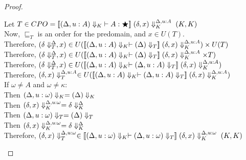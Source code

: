 \begin{proof}
\begin{itemize}
\begin{tabbedproof}
    \ooooo Let $T \in CPO = \interp{\judgeWK[\restrictkind{\Delta, u:A}]{A}{\bigstar}}\;
                               \restricttyenv{\Delta, u:A}{(\delta, x)}\;(K,K)$ \\
    \ooooo Now, $\sqsubseteq_T$ is an order for the predomain, and $x \in U(T)$. \\
    \ooooo Therefore, $(\restrictvals{\Delta}{\delta}, x) \in 
                         U(\interp{\restrictkind{\Delta, u:A} \vdash \restricttype{\Delta}}\;
            \restricttyenv{\Delta, u:A}{(\delta, x)}) \times U(T)$ \\
    \ooooo Therefore, $(\restrictvals{\Delta}{\delta}, x) \in 
                         U(\interp{\restrictkind{\Delta, u:A} \vdash \restricttype{\Delta}}\;
            \restricttyenv{\Delta, u:A}{(\delta, x)} \times T)$ \\
    \ooooo Therefore, $(\restrictvals{\Delta}{\delta}, x) \in 
                         U(\interp{\restrictkind{\Delta, u:A} \vdash \restricttype{\Delta, u:A}}\;
            \restricttyenv{\Delta, u:A}{(\delta, x)})$ \\
    \ooooo Therefore, $\restrictvals{\Delta, u:A}{(\delta,x)} \in 
                         U(\interp{\restrictkind{\Delta, u:A} \vdash \restricttype{\Delta, u:A}}\;
            \restricttyenv{\Delta, u:A}{(\delta, x)})$ \\

    \oooo If $\omega \not= A$ and $\omega \not= \kappa$: \\
    \ooooo Then $\restrictkind{\Delta, u:\omega} = \restrictkind{\Delta}$ \\
    \ooooo Then $\restricttyenv{\Delta,u:\omega}{(\delta,x)} = \restricttyenv{\Delta}{\delta}$ \\
    \ooooo Then $\restricttype{\Delta, u:\omega} = \restricttype{\Delta}$ \\
    \ooooo Then $\restricttyenv{\Delta, u:\omega}{(\delta, x)} = \restricttyenv{\Delta}{\delta}$ \\
    \ooooo Therefore, $\restrictvals{\Delta,u:\omega}{(\delta,x)} \in 
              \interp{\restrictkind{\Delta, u:\omega} \vdash
                      \restricttype{\Delta, u:\omega}}\;
                     \restricttyenv{\Delta, u:\omega}{(\delta,x)}\;(K,K)$ \\

  \end{tabbedproof}
\end{itemize}
\end{proof}




